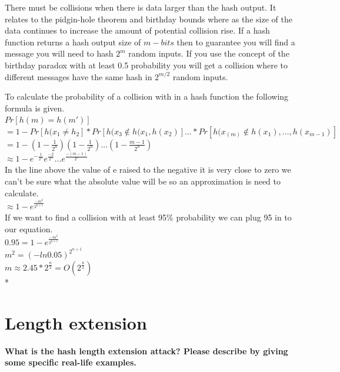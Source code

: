 \documentclass[letterpaper,11pt,notitlepage,fleqn]{article}
\begin{document}
There must be collisions when there is data larger than the hash output. It relates to the pidgin-hole theorem and birthday bounds where as the size of the data continues to increase the amount of potential collision rise. If a hash function returns a hash output size of $m-bits$ then to guarantee you will find a message you will need to hash $2^{m}$ random inputs. If you use the concept of the birthday paradox with at least 0.5 probability you will get a collision where to different
messages have the same hash in $2^{m/2}$ random inputs. 

To calculate the probability of a collision with in a hash function the following formula is given.\\
\indent $Pr[h(m) = h(m')]$ \\
\indent $= 1-Pr[h(x_{1} \neq h_{2}] \ast Pr[h(x_{3} \not\in {h(x_{1},h(x_{2})}] \dots \ast Pr[h(x_(m) \not\in {h(x_{1}), \dots ,h(x_{m-1})}]$ \\
\indent $= 1-(1-\frac{1}{2^{n}})(1-\frac{1}{2^{n}}) \dots (1-\frac{m-1}{2^{n}})$ \\
\indent $\approx 1-e^{-\frac{1}{2^{n}}}e^{\frac{-2}{2^{n}}} \dots e^{\frac{-(m-1)}{2^{n}}}$ \\
In the line above the value of e raised to the negative it is very close to zero we can't be sure what the absolute value will be so an approximation is need to calculate. \\
\indent $\approx 1-e^{\frac{-m^{2}}{2^{n+1}}}$\\
If we want to find a collision with at least 95\% probability we can plug 95 in to our equation. \\
\indent $0.95 = 1-e^{\frac{-m^{2}}{2^{n+1}}}$\\
\indent $m^{2} = (-ln 0.05)^{2^{n+1}}$ \\
\indent $m \approx 2.45 \ast 2^{\frac{n}{2}} = O(2^{\frac{n}{2}})$ \\
*\cite{cryptoeprint:2005:004}

\section{Length extension}
\noindent \textbf{What  is  the  hash  length  extension  attack?  Please  describe  by  giving  some  specific  real-life examples.}
\end{document}
